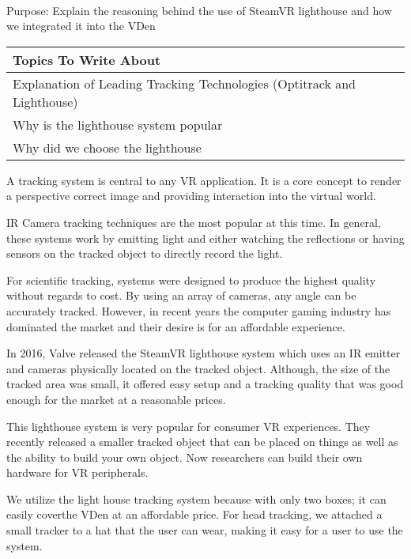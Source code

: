 \label{sec:hwTrackingSection}\\

\begin{center}
	\textcolor{OliveGreen}{Purpose: Explain the reasoning behind the use of SteamVR lighthouse and how we integrated it into the VDen}
    
    \begin{table}[H]
        \centering
        \renewcommand\arraystretch{0.5}
        \begin{tabular}{|l|}
            \hline 
            Topics To Write About \\ 
            \hline 
            Explanation of Leading Tracking Technologies (Optitrack and Lighthouse) \\  
            Why is the lighthouse system popular \\
            Why did we choose the lighthouse  \\
            \hline 
        \end{tabular}
    \end{table}
\end{center}

A tracking system is central to any VR application. It is a core concept to  render a perspective correct image and providing interaction into the virtual world. 

IR Camera tracking techniques are the most popular at this time. In general, these systems work by emitting light and either watching the reflections or having sensors on the tracked object to directly record the light. 

For scientific tracking, systems were designed to produce the highest quality without regards to cost. By using an array of cameras, any angle can be accurately tracked. However, in recent years the computer gaming industry has dominated the market and their desire is for an affordable experience.

In 2016, Valve released the SteamVR lighthouse system which uses an IR emitter and cameras physically located on the tracked object. Although, the size of the tracked area was small, it offered easy setup and a tracking quality that was good enough for the market at a reasonable prices.

This lighthouse system is very popular for consumer VR experiences. They recently released a smaller tracked object that can be placed on things as well as the ability to build your own object. Now researchers can build their own hardware for VR peripherals.

We utilize the light house tracking system because with only two boxes; it can easily coverthe VDen at an affordable price. For head tracking, we attached a small tracker to a hat that the user can wear, making it easy for a user to use the system.


\clearpage
